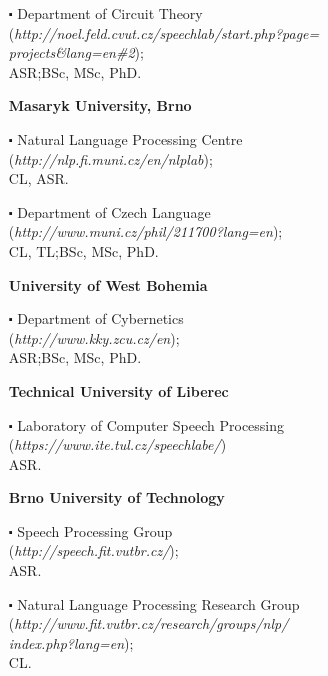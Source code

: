 \begin{multicols}{2}
\begin{enumerate}
\vspace*{0.009 cm}\item[$\centerdot$]Department of Circuit Theory\\(\textit{http://noel.feld.cvut.cz/speechlab/start.php?page=\\\hspace*{2em}projects\&lang=en\#2});\\ASR;\hspace*{1em}BSc, MSc, PhD.
\vspace*{0.09 cm}\item[] $\!\!\!\!\!\!$\textbf{Masaryk University, Brno}
\vspace*{0.009 cm}\item[$\centerdot$] Natural Language Processing Centre\\(\textit{http://nlp.fi.muni.cz/en/nlplab});\\ CL, ASR.
\vspace*{0.009 cm}\item[$\centerdot$] Department of Czech Language\\(\textit{http://www.muni.cz/phil/211700?lang=en});\\ CL, TL;\hspace*{1em}BSc, MSc, PhD.
\vspace*{0.09 cm}\item[] $\!\!\!\!\!\!$\textbf{University of West Bohemia}
\vspace*{0.009 cm}\item[$\centerdot$] Department of Cybernetics\\ (\textit{http://www.kky.zcu.cz/en});\\ ASR;\hspace*{1em}BSc, MSc, PhD.
\vspace*{0.09 cm}\item[] $\!\!\!\!\!\!$\textbf{Technical University of Liberec}
\vspace*{0.009 cm}\item[$\centerdot$]Laboratory of Computer Speech Processing\\(\textit{https://www.ite.tul.cz/speechlabe/})\\ ASR.
\newpage
\item[] $\!\!\!\!\!\!$\textbf{Brno University of Technology}
\item[$\centerdot$]Speech Processing Group\\(\textit{http://speech.fit.vutbr.cz/});\\ ASR.
\item[$\centerdot$]Natural Language Processing Research Group\\(\textit{http://www.fit.vutbr.cz/research/groups/nlp/\\\hspace*{2em}index.php?lang=en});\\CL.
\end{enumerate}


\end{multicols}
